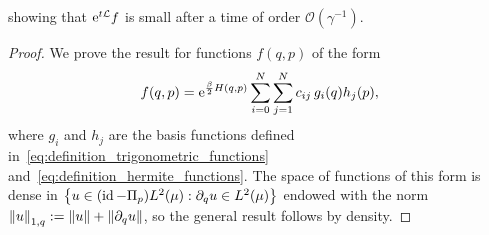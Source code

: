 \documentclass[11pt,a4paper]{article}
\begin{document}
showing that $\mathrm{e}^{t\mathcal L} f$ is small after a time of order $\mathcal O(\gamma^{-1})$.
\begin{proof}
    We prove the result for functions $f(q, p)$ of the form
    \begin{equation}
        \label{eq:expansion}
        f(q, p) = \mathrm{e}^{\frac{\beta}{2}H(q,p)}\sum_{i=0}^{N} \sum_{j=1}^{N} c_{ij} \, g_i(q) h_j(p),
    \end{equation}
    where $g_i$ and $h_j$ are the basis functions defined in~\eqref{eq:definition_trigonometric_functions} and~\eqref{eq:definition_hermite_functions}.
    The space of functions of this form is dense in $\bigl\{u \in (\operatorname{id} - \Pi_p) L^2(\mu): \partial_q u \in L^2(\mu) \bigr\}$
    endowed with the norm $\norm{u}_{1,q} := \norm{u} + \norm{\partial_q u}$,
    so the general result follows by density.


\end{proof}
\end{document}
